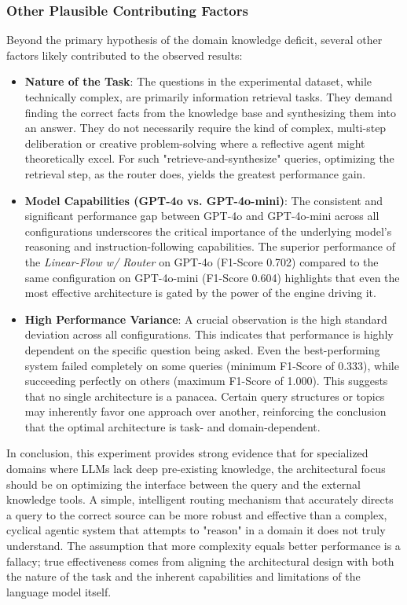         \subsubsection{Other Plausible Contributing Factors}
        
            Beyond the primary hypothesis of the domain knowledge deficit, several other factors likely contributed to the observed results:
            
            \begin{itemize}
                \item \textbf{Nature of the Task}: The questions in the experimental dataset, while technically complex, are primarily information retrieval tasks. They demand finding the correct facts from the knowledge base and synthesizing them into an answer. They do not necessarily require the kind of complex, multi-step deliberation or creative problem-solving where a reflective agent might theoretically excel. For such "retrieve-and-synthesize" queries, optimizing the retrieval step, as the router does, yields the greatest performance gain.
                
                \item \textbf{Model Capabilities (GPT-4o vs. GPT-4o-mini)}: The consistent and significant performance gap between GPT-4o and GPT-4o-mini across all configurations underscores the critical importance of the underlying model's reasoning and instruction-following capabilities. The superior performance of the \textit{Linear-Flow w/ Router} on GPT-4o (F1-Score 0.702) compared to the same configuration on GPT-4o-mini (F1-Score 0.604) highlights that even the most effective architecture is gated by the power of the engine driving it.
                
                \item \textbf{High Performance Variance}: A crucial observation is the high standard deviation across all configurations. This indicates that performance is highly dependent on the specific question being asked. Even the best-performing system failed completely on some queries (minimum F1-Score of 0.333), while succeeding perfectly on others (maximum F1-Score of 1.000). This suggests that no single architecture is a panacea. Certain query structures or topics may inherently favor one approach over another, reinforcing the conclusion that the optimal architecture is task- and domain-dependent.
            \end{itemize}
            
            In conclusion, this experiment provides strong evidence that for specialized domains where LLMs lack deep pre-existing knowledge, the architectural focus should be on optimizing the interface between the query and the external knowledge tools. A simple, intelligent routing mechanism that accurately directs a query to the correct source can be more robust and effective than a complex, cyclical agentic system that attempts to "reason" in a domain it does not truly understand. The assumption that more complexity equals better performance is a fallacy; true effectiveness comes from aligning the architectural design with both the nature of the task and the inherent capabilities and limitations of the language model itself.